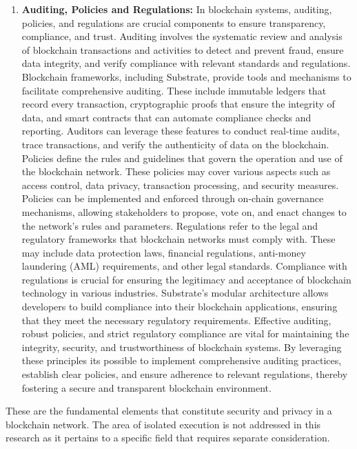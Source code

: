 \begin{enumerate}[label=\textbullet]
	\item\textbf{Auditing, Policies and Regulations:}\cite{hype_security}\cite{nist_pub_bloc_acc_ctrl}
    In blockchain systems, auditing, policies, and regulations are crucial components to ensure transparency, compliance, and trust. Auditing involves the systematic review and analysis of blockchain transactions and activities to detect and prevent fraud, ensure data integrity, and verify compliance with relevant standards and regulations.
	Blockchain frameworks, including Substrate, provide tools and mechanisms to facilitate comprehensive auditing. These include immutable ledgers that record every transaction, cryptographic proofs that ensure the integrity of data, and smart contracts that can automate compliance checks and reporting. Auditors can leverage these features to conduct real-time audits, trace transactions, and verify the authenticity of data on the blockchain.
	Policies define the rules and guidelines that govern the operation and use of the blockchain network. These policies may cover various aspects such as access control, data privacy, transaction processing, and security measures. Policies can be implemented and enforced through on-chain governance mechanisms, allowing stakeholders to propose, vote on, and enact changes to the network's rules and parameters.
	Regulations refer to the legal and regulatory frameworks that blockchain networks must comply with. These may include data protection laws, financial regulations, anti-money laundering (AML) requirements, and other legal standards. Compliance with regulations is crucial for ensuring the legitimacy and acceptance of blockchain technology in various industries. Substrate's modular architecture allows developers to build compliance into their blockchain applications, ensuring that they meet the necessary regulatory requirements.
	Effective auditing, robust policies, and strict regulatory compliance are vital for maintaining the integrity, security, and trustworthiness of blockchain systems. By leveraging these principles its possible to implement comprehensive auditing practices, establish clear policies, and ensure adherence to relevant regulations, thereby fostering a secure and transparent blockchain environment.

\end{enumerate}

These are the fundamental elements that constitute security and privacy in a blockchain network. The area of isolated execution is not addressed in this research as it pertains to a specific field that requires separate consideration. 

